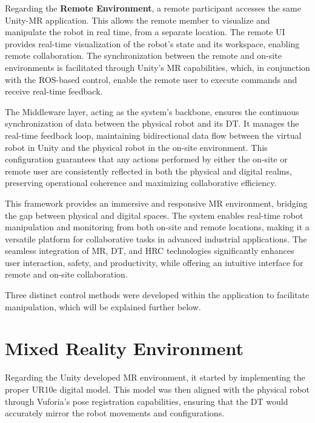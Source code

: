Regarding the \textbf{Remote Environment}, a remote participant accesses the same Unity-\ac{MR} application. This allows the remote member to visualize and manipulate the robot in real time, from a separate location. The remote \ac{UI} provides real-time visualization of the robot’s state and its workspace, enabling remote collaboration. The synchronization between the remote and on-site environments is facilitated through Unity’s \ac{MR} capabilities, which, in conjunction with the \ac{ROS}-based control, enable the remote user to execute commands and receive real-time feedback.

The Middleware layer, acting as the system’s backbone, ensures the continuous synchronization of data between the physical robot and its \ac{DT}. It manages the real-time feedback loop, maintaining bidirectional data flow between the virtual robot in Unity and the physical robot in the on-site environment. This configuration guarantees that any actions performed by either the on-site or remote user are consistently reflected in both the physical and digital realms, preserving operational coherence and maximizing collaborative efficiency.

This framework provides an immersive and responsive \ac{MR} environment, bridging the gap between physical and digital spaces. The system enables real-time robot manipulation and monitoring from both on-site and remote locations, making it a versatile platform for collaborative tasks in advanced industrial applications. The seamless integration of \ac{MR}, \ac{DT}, and \ac{HRC} technologies significantly enhances user interaction, safety, and productivity, while offering an intuitive interface for remote and on-site collaboration.


Three distinct control methods were developed within the application to facilitate manipulation, which will be explained further below.


\section{Mixed Reality Environment}

Regarding the Unity developed \ac{MR} environment, it started by implementing the proper UR10e digital model. This model was then aligned with the physical robot through Vuforia's pose registration capabilities, ensuring that the \ac{DT} would accurately mirror the robot movements and configurations.

